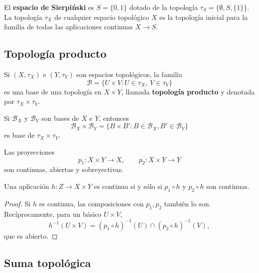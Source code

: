 \begin{observación}
    El \textbf{espacio de Sierpiński} es $S = \{0, 1\}$ dotado de la topología $\tau_S = \{\emptyset, S, \{1\}\}$. La topología $\tau_X$ de cualquier espacio topológico $X$ es la topología inicial para la familia de todas las aplicaciones continuas $X \to S$.
\end{observación}


\subsection{Topología producto}

\begin{definición}
    Si $(X,\tau_X)$ e $(Y,\tau_Y)$ son espacios topológicos, la familia
    $$\mathcal{B}=\{U\times V: U\in\tau_X,\ V\in\tau_Y\}$$
    es una base de una topología en $X\times Y$, llamada \textbf{topología producto} y denotada por $\tau_X\times\tau_Y$.
\end{definición}

\begin{proposición}
    Si $\mathcal{B}_X$ y $\mathcal{B}_Y$ son bases de $X$ e $Y$, entonces
    $$\mathcal{B}_X\times\mathcal{B}_Y=\{B\times B': B\in\mathcal{B}_X, B'\in\mathcal{B}_Y\}$$
    es base de $\tau_X\times\tau_Y$.
\end{proposición}

\begin{proposición}
    Las proyecciones
    $$p_1:X\times Y\to X,\qquad p_2:X\times Y\to Y$$
    son continuas, abiertas y sobreyectivas.
\end{proposición}

\begin{proposición}
    Una aplicación $h:Z\to X\times Y$ es continua si y sólo si $p_1\circ h$ y $p_2\circ h$ son continuas.
\end{proposición}
\begin{proof}
    Si $h$ es continua, las composiciones con $p_1,p_2$ también lo son. Recíprocamente, para un básico $U\times V$,
    $$h^{-1}(U\times V)=(p_1\circ h)^{-1}(U)\cap(p_2\circ h)^{-1}(V),$$
    que es abierto.
\end{proof}


\subsection{Suma topológica}

